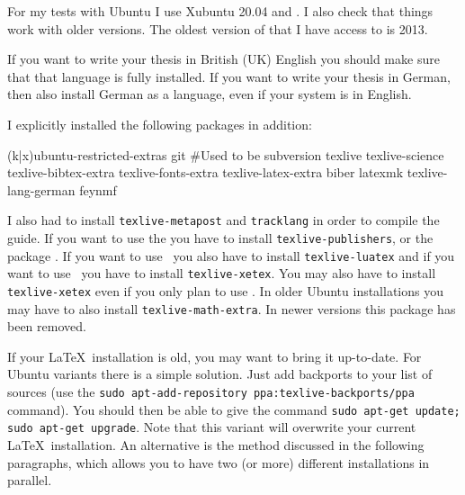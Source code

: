 For my tests with Ubuntu I use Xubuntu 20.04 and .
I also check that things work with older versions.
The oldest version of \TeXLive that I have access to is 2013.

If you want to write your thesis in British (UK) English you should make sure
that that language is fully installed. If you want to write your
thesis in German, then also install German as a language, even if
your system is in English.

I explicitly installed the following packages in addition:
\begin{bashlisting}
(k|x)ubuntu-restricted-extras
git #Used to be subversion
texlive
texlive-science
texlive-bibtex-extra
texlive-fonts-extra
texlive-latex-extra
biber
latexmk
texlive-lang-german
feynmf
\end{bashlisting}
\noindent I also had to install \texttt{texlive-metapost} and \texttt{tracklang} in order to compile the guide.
If you want to use the  you have to install \texttt{texlive-publishers},
or the package .
If you want to use \LuaLaTeX\ you also have to install \texttt{texlive-luatex}
and if you want to use \XeLaTeX\ you have to install \texttt{texlive-xetex}.
You may also have to install \texttt{texlive-xetex} even if you only plan to use \LuaLaTeX.
In older Ubuntu installations you may have to also install \texttt{texlive-math-extra}.
In newer versions this package has been removed.

If your \LaTeX\ installation is old, you may want to bring it up-to-date.
For Ubuntu variants there is a simple solution.
Just add \TeXLive backports to your list of sources
(use the \texttt{sudo apt-add-repository ppa:texlive-backports/ppa} command).
You should then be able to give the command
\texttt{sudo apt-get update; sudo apt-get upgrade}.
Note that this variant will overwrite your current
\LaTeX\ installation.
An alternative is the method discussed in the following paragraphs,
which allows you to have two (or more) different installations in parallel.



